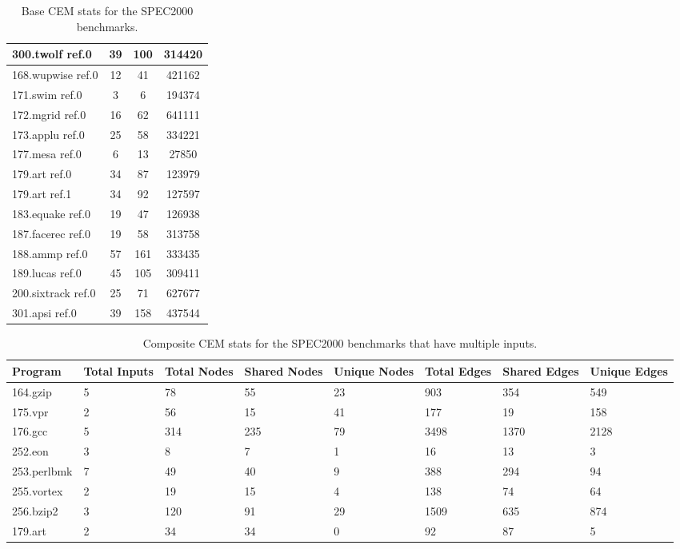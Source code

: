 \begin{table}[ht!]
\begin{tabular}{|p{1.3in}|c|c|c|}
\hline
300.twolf ref.0&39&100&314420\\
\hline\hline
168.wupwise ref.0&12&41&421162\\
\hline
171.swim ref.0&3&6&194374\\
\hline
172.mgrid ref.0&16&62&641111\\
\hline
173.applu ref.0&25&58&334221\\
\hline
177.mesa ref.0&6&13&27850\\
\hline
179.art ref.0&34&87&123979\\
\hline
179.art ref.1&34&92&127597\\
\hline
183.equake ref.0&19&47&126938\\
\hline
187.facerec ref.0&19&58&313758\\
\hline
188.ammp ref.0&57&161&333435\\
\hline
189.lucas ref.0&45&105&309411\\
\hline
200.sixtrack ref.0&25&71&627677\\
\hline
301.apsi ref.0&39&158&437544\\
\hline
\end{tabular}
\caption{Base CEM stats for the SPEC2000 benchmarks.}
\label{table:base_stats_2000}
\end{table}

\begin{table}[ht!]
\footnotesize
\center
\begin{tabular}{|p{1.0in}|p{0.4in}|p{0.4in}|p{0.4in}|p{0.4in}|p{0.4in}|p{0.4in}|p{0.4in}|}
\hline
Program&Total Inputs&Total Nodes&Shared Nodes&Unique Nodes&Total Edges&Shared Edges&Unique Edges\\
\hline\hline
164.gzip&5&78&55&23&903&354&549\\
\hline
175.vpr&2&56&15&41&177&19&158\\
\hline
176.gcc&5&314&235&79&3498&1370&2128\\
\hline
252.eon&3&8&7&1&16&13&3\\
\hline
253.perlbmk&7&49&40&9&388&294&94\\
\hline
255.vortex&2&19&15&4&138&74&64\\
\hline
256.bzip2&3&120&91&29&1509&635&874\\
\hline\hline
179.art&2&34&34&0&92&87&5\\
\hline
\end{tabular}
\caption{Composite CEM stats for the SPEC2000 benchmarks that have multiple
inputs.}
\label{table:composite_stats_2000}
\end{table}

